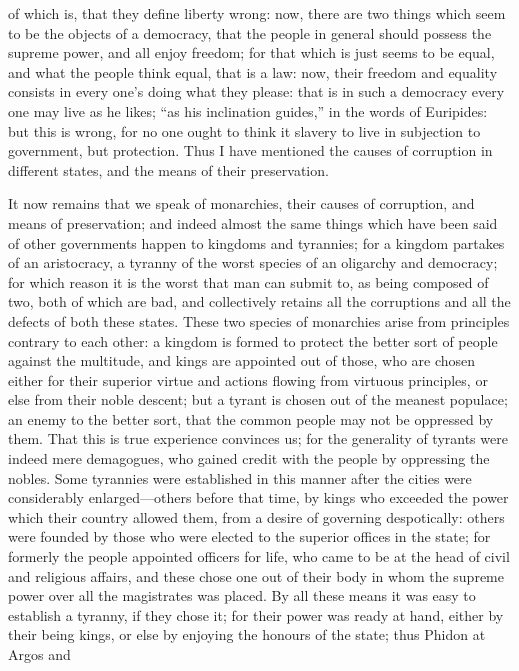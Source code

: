 of which is, that they define liberty wrong: now, there are two things
which seem to be the objects of a democracy, that the people in general
should possess the supreme power, and all enjoy freedom; for that which is
just seems to be equal, and what the people think equal, that is a law:
now, their freedom and equality consists in every one's doing what they
please: that is in such a democracy every one may live as he likes; ``as
his inclination guides,'' in the words of Euripides: but this is wrong, for
no one ought to think it slavery to live in subjection to government, but
protection. Thus I have mentioned the causes of corruption in different
states, and the means of their preservation.


It now remains that we speak of monarchies, their causes of corruption,
and means of preservation; and indeed almost the same things which have
been said of other governments happen to kingdoms and tyrannies; for a
kingdom partakes of an aristocracy, a tyranny of the worst species of an
oligarchy and democracy; for which reason it is the worst that man can
submit to, as being composed of two, both of which are bad, and
collectively retains all the corruptions and all the defects of both these
states. These two species of monarchies arise from principles contrary to
each other: a kingdom is formed to protect the better sort of people
against the multitude, and kings are appointed out of those, who are
chosen either for their superior virtue and actions flowing from virtuous
principles, or else from their noble descent; but a tyrant is chosen out
of the meanest populace; an enemy to the better sort, that the common
people may not be oppressed by them. That this is true experience
convinces us; for the generality of tyrants were indeed mere demagogues,
who gained credit with the people by oppressing the nobles. Some tyrannies
were established in this manner after the cities were considerably
enlarged—others before that time, by kings who exceeded the power
which their country allowed them, from a desire of governing despotically:
others were founded by those who were elected to the superior offices in
the state; for formerly the people appointed officers for life, who came
to be at the head of civil and religious affairs, and these chose one out
of their body in whom the supreme power over all the magistrates was
placed. By all these means it was easy to establish a tyranny, if they
chose it; for their power was ready at hand, either by their being kings,
or else by enjoying the honours of the state; thus Phidon at Argos and
